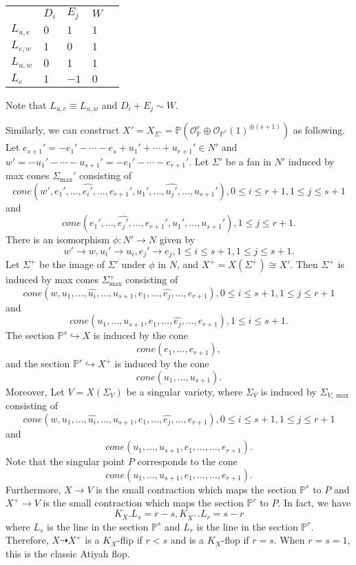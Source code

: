 \documentclass{article}
\begin{document}
\begin{tabular}{lllll}
           & $D_{i}$ & $E_{j}$  & $W$   \\
 $L_{u,e}$ & $0$     & $1$      & $1$   \\
 $L_{e,w}$ & $1$     & $0$      & $1$   \\
 $L_{u,w}$ & $0$     & $1$      & $1$   \\
 $L_{e}$   & $1$     & $-1$     & $0$   
\end{tabular}

  
Note that $L_{u,e}\equiv L_{u,w}$ and $D_{i}+E_{j}\sim W$.

Similarly, we can construct $X'=X_{\Sigma'}=\mathbb{P}(\mathcal{O}_{\mathbb{P}}^r\oplus {\mathcal{O}_{\mathbb{P}^r}(1)}^{\oplus (s+1)})$ as following.
Let $e_{s+1}'=-e_{1}'-\cdots-e_{s}+u_{1}'+\cdots+u_{r+1}'\in N'$ and $w'=-u_{1}'-\cdots-u_{s+1}'=-e_{1}'-\cdots -e_{r+1}'$.
Let $\Sigma'$ be a fan in $N'$ induced by max cones $\Sigma_{\max}'$ consisting of 
\[
cone(w',e_{1}',\ldots,\hat{e_i'},\ldots,e_{r+1}',u_{1}',\ldots,\hat{u_{j}'},\ldots,u_{s+1}'), 0\leqslant i \leqslant r+1, 1 \leqslant j \leqslant s+1
\]
and 
\[
cone(e_{1}',\ldots, \hat{e_{j}'} , \ldots ,e_{r+1}',u_{1}',\ldots,u_{s+1}'),1\leqslant j \leqslant r+1.
\]
There is an isomorphism $\phi:N'\to N$ given by
\[
w'\to w,u_i'\to u_i, e_j'\to e_j, 1\leqslant i \leqslant s+1,1\leqslant j \leqslant s+1.
\]
Let $\Sigma^+$ be the image of $\Sigma'$ under $\phi$ in $N$, and $X^+=X(\Sigma^+)\cong X'$. Then $\Sigma^+$ is induced by max cones $\Sigma^+_{\max}$ consisting of 
\[
cone(w,u_{1},\ldots,\hat{u_i},\ldots,u_{s+1},e_{1},\ldots,\hat{e_{j}},\ldots,e_{r+1}), 0\leqslant i \leqslant s+1, 1 \leqslant j \leqslant r+1
\]
and 
\[
cone(u_{1},\ldots,u_{s+1},e_{1},\ldots,\hat{e_j},\ldots,e_{r+1}),1\leqslant i \leqslant s+1.
\]
The section $\mathbb{P}^s\hookrightarrow X$ is induced by the cone
\[
cone(e_1,\ldots,e_{r+1}),
\]
and  the section $\mathbb{P}^r\hookrightarrow X^+$ is induced by the cone
\[
cone(u_1,\ldots,u_{s+1}).
\]
Moreover, Let $V=X(\Sigma_V)$ be a singular variety, where $\Sigma_V$ is induced by $\Sigma_{V,\max}$ consisting of 
\[
cone(w,u_{1},\ldots,\hat{u_i},\ldots,u_{s+1},e_{1},\ldots,\hat{e_{j}},\ldots,e_{r+1}), 0\leqslant i \leqslant s+1, 1 \leqslant j \leqslant r+1
\]
and 
\[
cone(u_{1},\ldots,u_{s+1},e_{1},\ldots,\ldots,e_{r+1}).
\]
Note that the singular point $P$ corresponds to the cone
\[
cone(u_{1},\ldots,u_{s+1},e_{1},\ldots,\ldots,e_{r+1}).
\]
Furthermore, $X\to V$ is the small contraction which maps the section $\mathbb{P}^s$ to $P$ and $X^+\to V$ is the small contraction which maps the section $\mathbb{P}^r$ to $P$. In fact, we have
\[ K_X.L_s=r-s,K_{X^+}.L_r=s-r\]
where $L_s$ is the line in the section $\mathbb{P}^s$ and $L_r$ is the line in the section $\mathbb{P}^r$. Therefore, $X \dashrightarrow X^+$ is a $K_X$-flip if $r<s$ and is a $K_X$-flop if $r=s$.
When $r=s=1$, this is the classic Atiyah flop.
\end{document}
